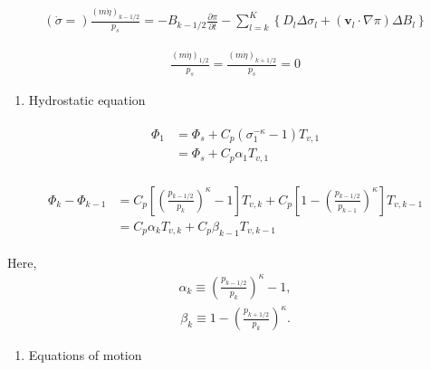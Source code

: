 \begin{eqnarray}
(\dot{\sigma}=) \frac{(m \dot{\eta})_{k-1 / 2}}{p_{s}}=-B_{k-1 / 2} \frac{\partial \pi}{\partial t}-\sum_{l=k}^{K}\left\{D_{l} \Delta \sigma_{l}+\left(\mathbf{v}_{l} \cdot \nabla \pi\right) \Delta B_{l}\right\}
\end{eqnarray}

\begin{eqnarray}
  \frac{(m\dot{\eta})_{1/2}}{p_s} = \frac{(m\dot{\eta})_{k+1/2}}{p_s} = 0  \end{eqnarray}

\begin{enumerate}
\def\labelenumi{\arabic{enumi}.}
\setcounter{enumi}{1}
\tightlist
\item
  Hydrostatic equation
\end{enumerate}

\begin{eqnarray}
\begin{aligned}
\Phi_{1} &=\Phi_{s}+C_{p}\left(\sigma_{1}^{-\kappa}-1\right) T_{v, 1} \\
&=\Phi_{s}+C_{p} \alpha_{1} T_{v, 1}
\end{aligned}
\end{eqnarray}

\begin{eqnarray}
\begin{aligned}
\Phi_{k}-\Phi_{k-1} &=C_{p}\left[\left(\frac{p_{k-1 / 2}}{p_{k}}\right)^{\kappa}-1\right] T_{v, k}+C_{p}\left[1-\left(\frac{p_{k-1 / 2}}{p_{k-1}}\right)^{\kappa}\right] T_{v, k-1} \\
&=C_{p} \alpha_{k} T_{v, k}+C_{p} \beta_{k-1} T_{v, k-1}
\end{aligned}
\end{eqnarray}

Here, \begin{eqnarray}
 \alpha_k \equiv \left( \frac{ p_{k-1/2} }
                               { p_k } \right)^{\kappa} -1,
\end{eqnarray} \begin{eqnarray}
 \beta_k \equiv 1- \left( \frac{ p_{k+1/2} }
                               { p_k } \right)^{\kappa} .\end{eqnarray}

\begin{enumerate}
\def\labelenumi{\arabic{enumi}.}
\setcounter{enumi}{2}
\tightlist
\item
  Equations of motion
\end{enumerate}

